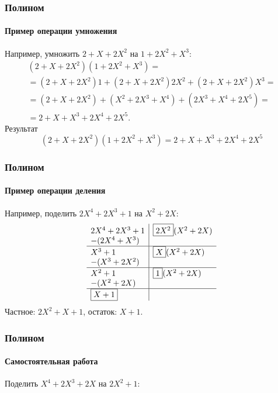 \begin{frame}
    \frametitle{Полином}
    \framesubtitle{Пример операции умножения}
    
    Например, умножить $2+X+2X^2$ на $1+2X^2+X^3$:
    \[
        \begin{split}
            (2+X+2X^2)(1+2X^2+X^3)=\\
            =(2+X+2X^2)1+(2+X+2X^2)2X^2+(2+X+2X^2)X^3=\\
            =(2+X+2X^2)+(X^2+2X^3+X^4)+(2X^3+X^4+2X^5)=\\
            =2+X+X^3+2X^4+2X^5.
        \end{split}
    \] 
    \alert{Результат}\[(2+X+2X^2)(1+2X^2+X^3)=2+X+X^3+2X^4+2X^5\]
\end{frame}


\begin{frame}
    \frametitle{Полином}
    \framesubtitle{Пример операции деления}
    
    Например, поделить $2X^4+2X^3+1 $ на $X^2+2X$:
    \[
        \begin{array}[c]{l|l}
            2X^4+2X^3+1     & \fbox{$2X^2$}(X^2+2X)\\
            -(2X^4+X^3)     &\\
            \hline
            X^3+1           & \fbox{$X$}(X^2+2X)\\
            -(X^3+2X^2)     &\\
            \hline
            X^2+1           & \fbox{$1$}(X^2+2X)\\
            -(X^2+2X)       &\\
            \hline
            \fbox{$X+1$}    &\\
        \end{array}
    \] 
    \alert{Частное}: $2X^2+X+1$, \alert{остаток}: $X+1$.
\end{frame}

\begin{frame}
    \frametitle{Полином}
    \framesubtitle{Самостоятельная работа}
    
    Поделить $X^4+2X^3+2X$ на $2X^2+1$:
\end{frame}

